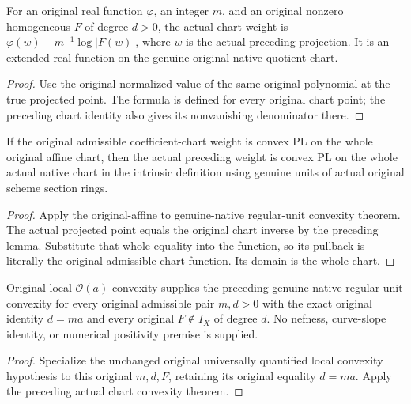 \begin{definition}
\label{projective:actual-original-admissible-chart-weight}
\leanok
{}
For an original real function $\varphi$, an integer $m$, and an original
nonzero homogeneous $F$ of degree $d>0$, the actual chart weight is
$\varphi(w)-m^{-1}\log|F(w)|$, where $w$ is the actual preceding projection.
It is an extended-real function on the genuine original native quotient chart.
\end{definition}
\begin{proof}
Use the original normalized value of the same original polynomial at the true
projected point. The formula is defined for every original chart point; the
preceding chart identity also gives its nonvanishing denominator there.
\end{proof}

\begin{lemma}
\label{projective:actual-original-admissible-chart-convexity}
\leanok
{}
If the original admissible coefficient-chart weight is convex PL on the whole
original affine chart, then the actual preceding weight is convex PL on the
whole actual native chart in the intrinsic definition using genuine units of
actual original scheme section rings.
\end{lemma}
\begin{proof}
Apply the original-affine to genuine-native regular-unit convexity theorem.
The actual projected point equals the original chart inverse by the preceding
lemma. Substitute that whole equality into the function, so its pullback is
literally the original admissible chart function. Its domain is the whole chart.
\end{proof}

\begin{corollary}
\label{projective:actual-original-prescribed-class-chart-convexity}
\leanok
{}
Original local $\mathcal O(a)$-convexity supplies the preceding genuine native
regular-unit convexity for every original admissible pair $m,d>0$ with the
exact original identity $d=ma$ and every original $F\notin I_X$ of degree $d$.
No nefness, curve-slope identity, or numerical positivity premise is supplied.
\end{corollary}
\begin{proof}
Specialize the unchanged original universally quantified local convexity
hypothesis to this original $m,d,F$, retaining its original equality $d=ma$.
Apply the preceding actual chart convexity theorem.
\end{proof}
